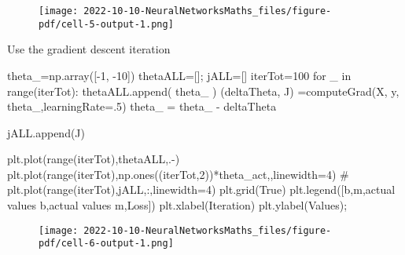 \documentclass[
  letterpaper,
  DIV=11,
  numbers=noendperiod]{scrartcl}
\newenvironment{Shaded}{\begin{snugshade}}{\end{snugshade}}
\newcommand{\BuiltInTok}[1]{\textcolor[rgb]{0.00,0.23,0.31}{#1}}
\newcommand{\CommentTok}[1]{\textcolor[rgb]{0.37,0.37,0.37}{#1}}
\newcommand{\ControlFlowTok}[1]{\textcolor[rgb]{0.00,0.23,0.31}{#1}}
\newcommand{\DecValTok}[1]{\textcolor[rgb]{0.68,0.00,0.00}{#1}}
\newcommand{\FloatTok}[1]{\textcolor[rgb]{0.68,0.00,0.00}{#1}}
\newcommand{\KeywordTok}[1]{\textcolor[rgb]{0.00,0.23,0.31}{#1}}
\newcommand{\NormalTok}[1]{\textcolor[rgb]{0.00,0.23,0.31}{#1}}
\newcommand{\OperatorTok}[1]{\textcolor[rgb]{0.37,0.37,0.37}{#1}}
\newcommand{\StringTok}[1]{\textcolor[rgb]{0.13,0.47,0.30}{#1}}
\newcommand{\VariableTok}[1]{\textcolor[rgb]{0.07,0.07,0.07}{#1}}
\begin{document}
\begin{figure}[H]

{\centering \texttt{[image: 2022-10-10-NeuralNetworksMaths\_files/figure-pdf/cell-5-output-1.png]}

}

\end{figure}

Use the gradient descent iteration

\begin{Shaded}
\begin{Highlighting}[]
\NormalTok{theta\_}\OperatorTok{=}\NormalTok{np.array([}\OperatorTok{{-}}\DecValTok{1}\NormalTok{, }\OperatorTok{{-}}\DecValTok{10}\NormalTok{])}
\NormalTok{thetaALL}\OperatorTok{=}\NormalTok{[]}\OperatorTok{;}\NormalTok{ jALL}\OperatorTok{=}\NormalTok{[]}
\NormalTok{iterTot}\OperatorTok{=}\DecValTok{100}
\ControlFlowTok{for}\NormalTok{ \_ }\KeywordTok{in} \BuiltInTok{range}\NormalTok{(iterTot):}
\NormalTok{    thetaALL.append( theta\_ )}
\NormalTok{    (deltaTheta, J) }\OperatorTok{=}\NormalTok{computeGrad(X, y, theta\_,learningRate}\OperatorTok{=}\FloatTok{.5}\NormalTok{)}
\NormalTok{    theta\_ }\OperatorTok{=}\NormalTok{ theta\_ }\OperatorTok{{-}}\NormalTok{ deltaTheta}
    
\NormalTok{    jALL.append(J)}

\NormalTok{plt.plot(}\BuiltInTok{range}\NormalTok{(iterTot),thetaALL,}\StringTok{\textquotesingle{}.{-}\textquotesingle{}}\NormalTok{)}
\NormalTok{plt.plot(}\BuiltInTok{range}\NormalTok{(iterTot),np.ones((iterTot,}\DecValTok{2}\NormalTok{))}\OperatorTok{*}\NormalTok{theta\_act,}\StringTok{\textquotesingle{}{-}{-}\textquotesingle{}}\NormalTok{,linewidth}\OperatorTok{=}\DecValTok{4}\NormalTok{)}
\CommentTok{\# plt.plot(range(iterTot),jALL,\textquotesingle{}:\textquotesingle{},linewidth=4)}
\NormalTok{plt.grid(}\VariableTok{True}\NormalTok{)}
\NormalTok{plt.legend([}\StringTok{\textquotesingle{}b\textquotesingle{}}\NormalTok{,}\StringTok{\textquotesingle{}m\textquotesingle{}}\NormalTok{,}\StringTok{\textquotesingle{}actual values b\textquotesingle{}}\NormalTok{,}\StringTok{\textquotesingle{}actual values m\textquotesingle{}}\NormalTok{,}\StringTok{\textquotesingle{}Loss\textquotesingle{}}\NormalTok{])}
\NormalTok{plt.xlabel(}\StringTok{\textquotesingle{}Iteration\textquotesingle{}}\NormalTok{)}
\NormalTok{plt.ylabel(}\StringTok{\textquotesingle{}Values\textquotesingle{}}\NormalTok{)}\OperatorTok{;}

\end{Highlighting}
\end{Shaded}

\begin{figure}[H]

{\centering \texttt{[image: 2022-10-10-NeuralNetworksMaths\_files/figure-pdf/cell-6-output-1.png]}

}

\end{figure}
\end{document}
